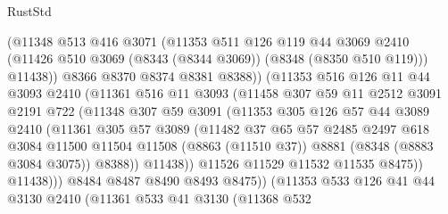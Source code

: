 \begin{lexlean}{RustStd}
\begin{coremodule}
{\begin{coremodule}
{{{{{{{{{{{{{{{{{{{{{{{{{{{{{{{{{{{{{{{{{{{{{{{{{{                    (@11348
                      @513
                      @416
                      @3071
                      (@11353
                        @511
                        @126
                        @119
                        @44
                        @3069
                        @2410
                        (@11426 @510 @3069 (@8343 (@8344 @3069)) (@8348 (@8350 @510 @119)))
                        @11438))
                    @8366
                    @8370
                    @8374
                    @8381
                    @8388))
                (@11353
                  @516
                  @126
                  @11
                  @44
                  @3093
                  @2410
                  (@11361
                    @516
                    @11
                    @3093
                    (@11458
                      @307
                      @59
                      @11
                      @2512
                      @3091
                      @2191
                      @722
                      (@11348
                        @307
                        @59
                        @3091
                        (@11353
                          @305
                          @126
                          @57
                          @44
                          @3089
                          @2410
                          (@11361
                            @305
                            @57
                            @3089
                            (@11482
                              @37
                              @65
                              @57
                              @2485
                              @2497
                              @618
                              @3084
                              @11500
                              @11504
                              @11508
                              (@8863 (@11510 @37))
                              @8881
                              (@8348 (@8883 @3084 @3075))
                              @8388))
                          @11438))
                      @11526
                      @11529
                      @11532
                      @11535
                      @8475))
                  @11438)))
            @8484
            @8487
            @8490
            @8493
            @8475))
        (@11353
          @533
          @126
          @41
          @44
          @3130
          @2410
          (@11361
            @533
            @41
            @3130
            (@11368
              @532
}}}}}}}}}}}}}}}}}}}}}}}}}}}}}}}}}}}}}}}}}}}}}}}}}}
\end{coremodule}}
\end{coremodule}
\end{lexlean}
